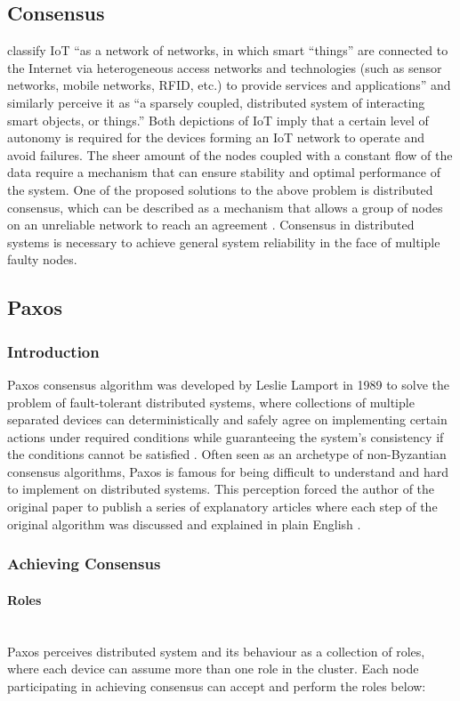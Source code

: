 \documentclass[oneside,12pt]{book}
\newcommand{\myparagraph}[1]{\paragraph{#1}\mbox{}\\}
\begin{document}
\subsection{Consensus}
\par {}\cite{6740862} classify IoT “as a network of networks, in which smart “things” are connected to the Internet via heterogeneous access networks and technologies (such as sensor networks, mobile networks, RFID, etc.) to provide services and applications” and similarly \cite{OROSTICA201915} perceive it as “a sparsely coupled, distributed system of interacting smart objects, or things.”\smallskip \newline
Both depictions of IoT imply that a certain level of autonomy is required for the devices forming an IoT network to operate and avoid failures. The sheer amount of the nodes coupled with a constant flow of the data require a mechanism that can ensure stability and optimal performance of the system. \smallskip \newline
One of the proposed solutions to the above problem is distributed consensus, which can be described as a mechanism that allows a group of nodes on an unreliable network to reach an agreement \citep{DistributedConsensus}. Consensus in distributed systems is necessary to achieve general system reliability in the face of multiple faulty nodes.
\subsection{Paxos}
\subsubsection{Introduction}
\par Paxos consensus algorithm was developed by Leslie Lamport in 1989 to solve the problem of fault-tolerant distributed systems, where collections of multiple separated devices can deterministically and safely agree on implementing certain actions under required conditions while guaranteeing the system’s consistency if the conditions cannot be satisfied \citep{LI2020247}. Often seen as an archetype of non-Byzantian consensus algorithms, Paxos is famous for being difficult to understand and hard to implement on distributed systems. This perception forced the author of the original paper to publish a series of explanatory articles where each step of the original algorithm was discussed and explained in plain English \citep{lamport1998the,lamport2001paxos,MSR-TR-2005-33}.
\subsubsection{Achieving Consensus}
\myparagraph{Roles}
Paxos perceives distributed system and its behaviour as a collection of roles, where each device can assume more than one role in the cluster. Each node participating in achieving consensus can accept and perform the roles below:
\end{document}
